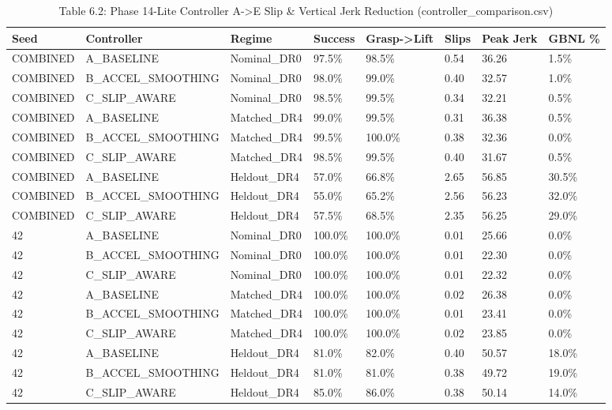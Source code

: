 \documentclass[11pt,a4paper,oneside]{book}
\begin{document}
\begin{longtable}{l l l l l l l l}\caption{Table 6.2: Phase 14-Lite Controller A->E Slip \& Vertical Jerk Reduction (controller\_comparison.csv)}\\\toprule
Seed & Controller & Regime & Success & Grasp->Lift & Slips & Peak Jerk & GBNL \% \\ \midrule \endhead
COMBINED & A\_BASELINE & Nominal\_DR0 & 97.5\% & 98.5\% & 0.54 & 36.26 & 1.5\% \\
COMBINED & B\_ACCEL\_SMOOTHING & Nominal\_DR0 & 98.0\% & 99.0\% & 0.40 & 32.57 & 1.0\% \\
COMBINED & C\_SLIP\_AWARE & Nominal\_DR0 & 98.5\% & 99.5\% & 0.34 & 32.21 & 0.5\% \\
COMBINED & A\_BASELINE & Matched\_DR4 & 99.0\% & 99.5\% & 0.31 & 36.38 & 0.5\% \\
COMBINED & B\_ACCEL\_SMOOTHING & Matched\_DR4 & 99.5\% & 100.0\% & 0.38 & 32.36 & 0.0\% \\
COMBINED & C\_SLIP\_AWARE & Matched\_DR4 & 98.5\% & 99.5\% & 0.40 & 31.67 & 0.5\% \\
COMBINED & A\_BASELINE & Heldout\_DR4 & 57.0\% & 66.8\% & 2.65 & 56.85 & 30.5\% \\
COMBINED & B\_ACCEL\_SMOOTHING & Heldout\_DR4 & 55.0\% & 65.2\% & 2.56 & 56.23 & 32.0\% \\
COMBINED & C\_SLIP\_AWARE & Heldout\_DR4 & 57.5\% & 68.5\% & 2.35 & 56.25 & 29.0\% \\
42 & A\_BASELINE & Nominal\_DR0 & 100.0\% & 100.0\% & 0.01 & 25.66 & 0.0\% \\
42 & B\_ACCEL\_SMOOTHING & Nominal\_DR0 & 100.0\% & 100.0\% & 0.01 & 22.30 & 0.0\% \\
42 & C\_SLIP\_AWARE & Nominal\_DR0 & 100.0\% & 100.0\% & 0.01 & 22.32 & 0.0\% \\
42 & A\_BASELINE & Matched\_DR4 & 100.0\% & 100.0\% & 0.02 & 26.38 & 0.0\% \\
42 & B\_ACCEL\_SMOOTHING & Matched\_DR4 & 100.0\% & 100.0\% & 0.01 & 23.41 & 0.0\% \\
42 & C\_SLIP\_AWARE & Matched\_DR4 & 100.0\% & 100.0\% & 0.02 & 23.85 & 0.0\% \\
42 & A\_BASELINE & Heldout\_DR4 & 81.0\% & 82.0\% & 0.40 & 50.57 & 18.0\% \\
42 & B\_ACCEL\_SMOOTHING & Heldout\_DR4 & 81.0\% & 81.0\% & 0.38 & 49.72 & 19.0\% \\
42 & C\_SLIP\_AWARE & Heldout\_DR4 & 85.0\% & 86.0\% & 0.38 & 50.14 & 14.0\% \\

\end{longtable}
\end{document}

